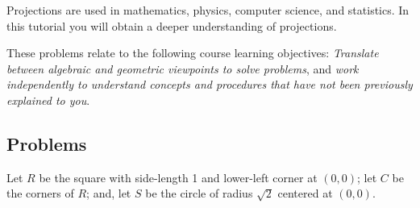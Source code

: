 		\begin{objectives}
			Projections are used in mathematics, physics, computer science, and
			statistics.
	In this tutorial you will obtain a deeper understanding of projections.

	These problems relate to the following course learning objectives:
			\textit{Translate between algebraic and geometric viewpoints to solve problems},
			and
			\textit{work independently to understand concepts and procedures that have not been previously
			explained to you}.
		\end{objectives}

		\vspace{-.5em}
		\subsection*{Problems}
		\vspace{-.5em}

		Let $R$ be the square with side-length 1 and lower-left corner at $(0,0)$;
		let $C$ be the corners of $R$; and, let $S$ be the circle of radius $\sqrt{2}$ centered
		at $(0,0)$.

